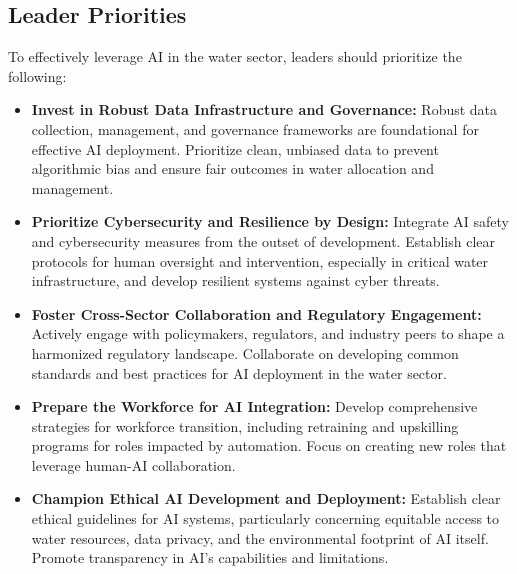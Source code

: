 \subsection{Leader Priorities}
To effectively leverage AI in the water sector, leaders should prioritize the following:
\begin{itemize}
    \item \textbf{Invest in Robust Data Infrastructure and Governance:} Robust data collection, management, and governance frameworks are foundational for effective AI deployment. Prioritize clean, unbiased data to prevent algorithmic bias and ensure fair outcomes in water allocation and management.
    \item \textbf{Prioritize Cybersecurity and Resilience by Design:} Integrate AI safety and cybersecurity measures from the outset of development. Establish clear protocols for human oversight and intervention, especially in critical water infrastructure, and develop resilient systems against cyber threats.
    \item \textbf{Foster Cross-Sector Collaboration and Regulatory Engagement:} Actively engage with policymakers, regulators, and industry peers to shape a harmonized regulatory landscape. Collaborate on developing common standards and best practices for AI deployment in the water sector.
    \item \textbf{Prepare the Workforce for AI Integration:} Develop comprehensive strategies for workforce transition, including retraining and upskilling programs for roles impacted by automation. Focus on creating new roles that leverage human-AI collaboration.
    \item \textbf{Champion Ethical AI Development and Deployment:} Establish clear ethical guidelines for AI systems, particularly concerning equitable access to water resources, data privacy, and the environmental footprint of AI itself. Promote transparency in AI's capabilities and limitations.
\end{itemize}

